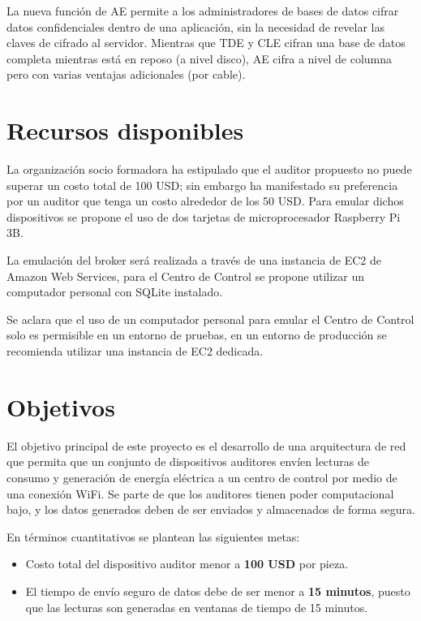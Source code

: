 \documentclass{article}
\begin{document}
            La nueva función de AE permite a los administradores de bases de datos cifrar datos confidenciales dentro de una aplicación, sin la necesidad de revelar las claves de cifrado al servidor. Mientras que TDE y CLE cifran una base de datos completa mientras está en reposo (a nivel disco), AE cifra a nivel de columna pero con varias ventajas adicionales (por cable).

    \section{Recursos disponibles} \label{sec:resources}

        La organización socio formadora ha estipulado que el auditor propuesto no puede superar un costo total de 100 USD; sin embargo ha manifestado su preferencia por un auditor que tenga un costo alrededor de los 50 USD. Para emular dichos dispositivos se propone el uso de dos tarjetas de microprocesador Raspberry Pi 3B.

        La emulación del broker será realizada a través de una instancia de EC2 de Amazon Web Services, para el Centro de Control se propone utilizar un computador personal con SQLite instalado.

        Se aclara que el uso de un computador personal para emular el Centro de Control solo es permisible en un entorno de pruebas, en un entorno de producción se recomienda utilizar una instancia de EC2 dedicada.

    \section{Objetivos} \label{sec:objectives}

        El objetivo principal de este proyecto es el desarrollo de una arquitectura de red que permita que un conjunto de dispositivos auditores envíen lecturas de consumo y generación de energía eléctrica a un centro de control por medio de una conexión WiFi. Se parte de que los auditores tienen poder computacional bajo, y los datos generados deben de ser enviados y almacenados de forma segura.

        En términos cuantitativos se plantean las siguientes metas:
        \begin{itemize}[noitemsep, leftmargin=*]
            \item Costo total del dispositivo auditor menor a \textbf{100 USD} por pieza.
            \item El tiempo de envío seguro de datos debe de ser menor a \textbf{15 minutos}, puesto que las lecturas son generadas en ventanas de tiempo de 15 minutos.
        \end{itemize}
\end{document}
